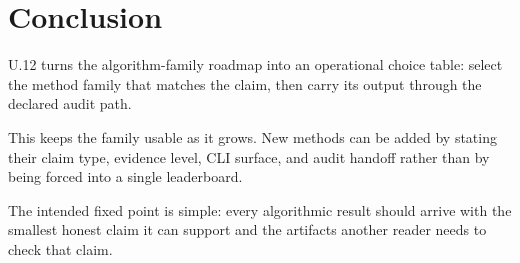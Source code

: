 \section{Conclusion}

U.12 turns the algorithm-family roadmap into an operational choice table:
select the method family that matches the claim, then carry its output through
the declared audit path.

This keeps the family usable as it grows. New methods can be added by stating
their claim type, evidence level, CLI surface, and audit handoff rather than by
being forced into a single leaderboard.

The intended fixed point is simple: every algorithmic result should arrive with
the smallest honest claim it can support and the artifacts another reader needs
to check that claim.
